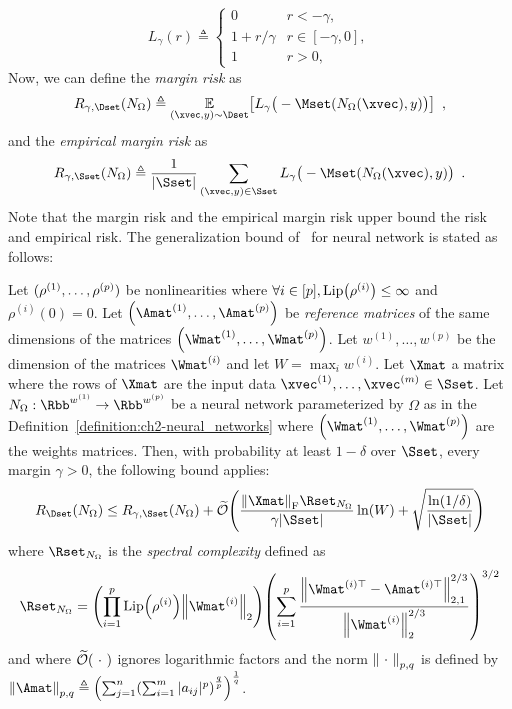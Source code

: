 \begin{equation}
  L_\gamma(r) \triangleq 
  \begin{cases}
    0 &r< -\gamma, \\
    1 + r/\gamma &r \in [-\gamma,0], \\
    1 & r > 0,
  \end{cases}
\end{equation}
Now, we can define the \emph{margin risk} as 
\begin{equation} \label{equation:ch2-margin_risk}
  R_{\gamma,\Dset} (N_\Omega) \triangleq \Ebb_{(\xvec, y) \sim \Dset} \left[ L_\gamma \big(-\Mset(N_\Omega(\xvec), y) \big) \right] \enspace,
\end{equation}
and the \emph{empirical margin risk} as 
\begin{equation} \label{equation:ch2-emprical_margin_risk}
  R_{\gamma,\Sset} (N_\Omega) \triangleq \frac{1}{|\Sset|} \sum_{(\xvec, y) \in \Sset} L_\gamma \big(-\Mset(N_\Omega(\xvec), y) \big) \enspace.
\end{equation}
Note that the margin risk and the empirical margin risk upper bound the risk and empirical risk.
The generalization bound of~\citet{bartlett2017spectrally} for neural network is stated as follows:
\begin{theorem}
  Let $(\rho^{(1)}, \dots, \rho^{(p)})$ be nonlinearities where $\forall i \in [\depth], \lip{\rho^{(i)}} \leq \infty$ and $\rho^{(i)}(0) = 0$.
  Let $\left( \Amat^{(1)}, \dots, \Amat^{(\depth)} \right)$ be \emph{reference matrices} of the same dimensions of the matrices $\left( \Wmat^{(1)}, \dots, \Wmat^{(\depth)} \right)$.
  Let $w^{(1)}, \dots, w^{(p)}$ be the dimension of the matrices $\Wmat^{(i)}$ and let $W = \max_i w^{(i)}$.
  Let $\Xmat$ a matrix where the rows of $\Xmat$ are the input data $\xvec^{(1)}, \dots, \xvec^{(m)} \in \Sset$.
  Let $N_\Omega: \Rbb^{w^{(1)}} \rightarrow \Rbb^{w^{(\depth)}}$ be a neural network parameterized by $\Omega$ as in the Definition~\ref{definition:ch2-neural_networks} where $\left( \Wmat^{(1)}, \dots, \Wmat^{(\depth)} \right)$ are the weights matrices.
  Then, with probability at least $1 - \delta$ over $\Sset$, every margin $\gamma > 0$, the following bound applies:
  \begin{equation}
    R_\Dset(N_\Omega) \leq R_{\gamma,\Sset} (N_\Omega) + \widetilde{\bigO}\left( \frac{\norm{\Xmat}_\fro \Rset_{N_\Omega}}{\gamma |\Sset|} \ln(W) + \sqrt{\frac{\ln(1/\delta)}{|\Sset|}} \right)
  \end{equation}
  where $\Rset_{N_\Omega}$ is the \emph{spectral complexity} defined as 
  \begin{equation}
    \Rset_{N_\Omega} = \left(\prod_{i = 1}^{\depth} \lip{\rho^{(i)}} \norm{\Wmat^{(i)}}_2 \right) \left( \sum_{i=1}^{\depth} \frac{\norm{\Wmat^{(i)\top} - \Amat^{(i)\top}}_{2,1}^{2/3}}{\norm{\Wmat^{(i)}}_2^{2/3}} \right)^{3/2}
  \end{equation}
  and where $\widetilde{\mathcal{O}}(\ \cdot\ )$ ignores logarithmic factors and the norm $\norm{\ \cdot\ }_{p,q}$ is defined by $\norm{\Amat}_{p,q} \triangleq \left( \sum _{j=1}^{n} \left(\sum _{i=1}^{m} |a_{ij}|^{p} \right)^{\frac {q}{p}}\right)^{\frac {1}{q}}$.
\end{theorem}

